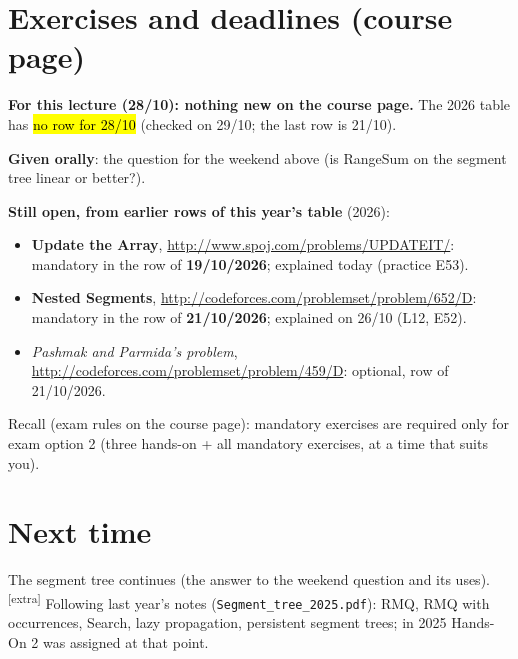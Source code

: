 \documentclass[11pt,a4paper]{article}
\theoremstyle{definition}\newtheorem*{definition}{Definition}
\newcommand{\hlb}[1]{{\sethlcolor{hlB}\hl{#1}}}
\newcommand{\extra}{\textsuperscript{\textcolor{warn}{[extra]}}}
\begin{document}
\section{Exercises and deadlines (course page)}\label{sec:ex}
\begin{keybox}
\textbf{For this lecture (28/10): nothing new on the course page.} The 2026 table has \hlb{no row for 28/10} (checked on 29/10; the last row is 21/10).

\smallskip
\textbf{Given orally}: the question for the weekend above (is \textsf{RangeSum} on the segment tree linear or better?).

\smallskip
\textbf{Still open, from earlier rows of this year's table} (2026):
\begin{itemize}[nosep]
\item \textbf{Update the Array}, \url{http://www.spoj.com/problems/UPDATEIT/}: mandatory in the row of \textbf{19/10/2026}; explained today (practice E53).
\item \textbf{Nested Segments}, \url{http://codeforces.com/problemset/problem/652/D}: mandatory in the row of \textbf{21/10/2026}; explained on 26/10 (L12, E52).
\item \emph{Pashmak and Parmida's problem}, \url{http://codeforces.com/problemset/problem/459/D}: optional, row of 21/10/2026.
\end{itemize}
Recall (exam rules on the course page): mandatory exercises are required only for exam option 2 (three hands-on + all mandatory exercises, at a time that suits you).
\end{keybox}

\section{Next time}
The segment tree continues (the answer to the weekend question and its uses). \extra{} Following last year's notes (\texttt{Segment\_tree\_2025.pdf}): RMQ, RMQ with occurrences,
\textsf{Search}, lazy propagation, persistent segment trees; in 2025 Hands-On 2 was assigned at that point.
\end{document}
